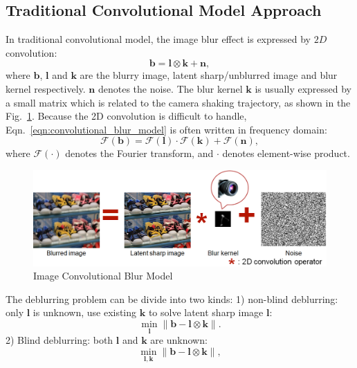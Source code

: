 \documentclass[journal, onecolumn, 10pt]{IEEEtran}
\begin{document}
\subsection{Traditional Convolutional Model Approach}
In traditional convolutional model, the image blur effect is expressed by $2D$ convolution:
\begin{equation}
\mathbf{b} = \mathbf{l} \otimes \mathbf{k} + \mathbf{n},
\label{eqn:convolutional_blur_model}
\end{equation}
where $\mathbf{b}$, $\mathbf{l}$ and $\mathbf{k}$ are the blurry image, latent sharp/unblurred image and blur kernel respectively. $\mathbf{n}$ denotes the noise. The blur kernel $\mathbf{k}$ is usually expressed by a small matrix which is related to the camera shaking trajectory, as shown in the Fig.~\ref{fig:convolutional_blur_model}. Because the 2D convolution is difficult to handle, Eqn.~\ref{eqn:convolutional_blur_model} is often written in frequency domain:
\begin{equation}
\mathcal{F}(\mathbf{b}) = \mathcal{F}(\mathbf{l}) \cdot \mathcal{F}(\mathbf{k}) + \mathcal{F}(\mathbf{n}),
\label{eqn:convolutional_blur_model_frequency}
\end{equation}
where $\mathcal{F}(\cdot)$ denotes the Fourier transform, and $\cdot$ denotes element-wise product.
\begin{figure}[h!]
\centering
\includegraphics[width = 1\textwidth]{pic/convolutional_model.png}
\caption{Image Convolutional Blur Model}
\label{fig:convolutional_blur_model}
\end{figure}

The deblurring problem can be divide into two kinds: 1) non-blind deblurring: only $\mathbf{l}$ is unknown, use existing $\mathbf{k}$ to solve latent sharp image $\mathbf{l}$:
\begin{equation}
\min_{\mathbf{l}} \| \mathbf{b} - \mathbf{l} \otimes \mathbf{k} \|.
\label{eqn:non_blind_origin}
\end{equation}
2) Blind deblurring: both $\mathbf{l}$ and $\mathbf{k}$ are unknown:
\begin{equation}
\min_{\mathbf{l}, \mathbf{k}} \| \mathbf{b} - \mathbf{l} \otimes \mathbf{k} \|,
\label{eqn:blind_origin}
\end{equation}
\end{document}
